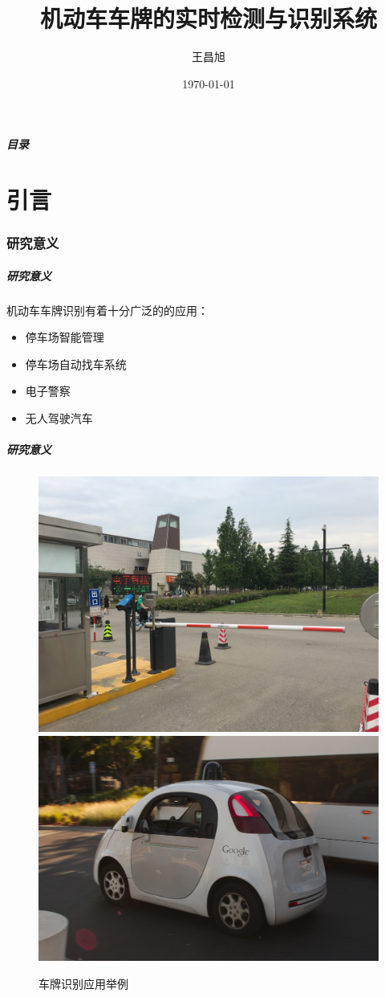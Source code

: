 \documentclass[UTF8]{beamer}
\title{机动车车牌的实时检测与识别系统}
\author[王昌旭]{王昌旭}
\institute[西安电子科技大学\\计算机学院]{西安电子科技大学计算机学院2012级本科生}
\date{\today}
\begin{document}
{ \xdbg
\begin{frame}
  \titlepage
\end{frame}
}

\begin{frame}[t, allowframebreaks]
  \frametitle{目录}
  \tableofcontents
\end{frame}

\part{引言}

\section{研究意义}
\begin{frame}
  \frametitle{研究意义}
  机动车车牌识别有着十分广泛的的应用：

  \begin{itemize}
    \item 停车场智能管理
    \item 停车场自动找车系统
    \item 电子警察
    \item 无人驾驶汽车
  \end{itemize} 
\end{frame}

\begin{frame}
  \frametitle{研究意义}
  \begin{figure}[ht]
    \centering
    {\includegraphics[width=0.45\linewidth]{./Figure/ParkingSystem.jpg}}
    {\includegraphics[width=0.45\linewidth]{./Figure/GoogleSelfDrivingCar.jpg}}
    \caption{车牌识别应用举例}
  \end{figure}
\end{frame}
\end{document}
